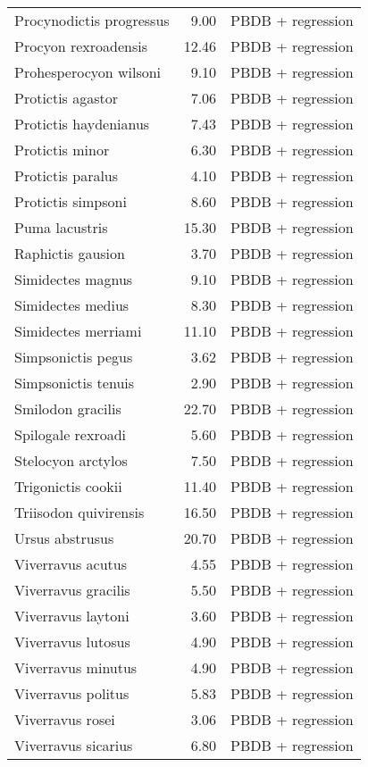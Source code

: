 \begin{table}[ht]
\begin{tabular}{lrl}
  Procynodictis progressus & 9.00 & PBDB + regression \\ 
  Procyon rexroadensis & 12.46 & PBDB + regression \\ 
  Prohesperocyon wilsoni & 9.10 & PBDB + regression \\ 
  Protictis agastor & 7.06 & PBDB + regression \\ 
  Protictis haydenianus & 7.43 & PBDB + regression \\ 
  Protictis minor & 6.30 & PBDB + regression \\ 
  Protictis paralus & 4.10 & PBDB + regression \\ 
  Protictis simpsoni & 8.60 & PBDB + regression \\ 
  Puma lacustris & 15.30 & PBDB + regression \\ 
  Raphictis gausion & 3.70 & PBDB + regression \\ 
  Simidectes magnus & 9.10 & PBDB + regression \\ 
  Simidectes medius & 8.30 & PBDB + regression \\ 
  Simidectes merriami & 11.10 & PBDB + regression \\ 
  Simpsonictis pegus & 3.62 & PBDB + regression \\ 
  Simpsonictis tenuis & 2.90 & PBDB + regression \\ 
  Smilodon gracilis & 22.70 & PBDB + regression \\ 
  Spilogale rexroadi & 5.60 & PBDB + regression \\ 
  Stelocyon arctylos & 7.50 & PBDB + regression \\ 
  Trigonictis cookii & 11.40 & PBDB + regression \\ 
  Triisodon quivirensis & 16.50 & PBDB + regression \\ 
  Ursus abstrusus & 20.70 & PBDB + regression \\ 
  Viverravus acutus & 4.55 & PBDB + regression \\ 
  Viverravus gracilis & 5.50 & PBDB + regression \\ 
  Viverravus laytoni & 3.60 & PBDB + regression \\ 
  Viverravus lutosus & 4.90 & PBDB + regression \\ 
  Viverravus minutus & 4.90 & PBDB + regression \\ 
  Viverravus politus & 5.83 & PBDB + regression \\ 
  Viverravus rosei & 3.06 & PBDB + regression \\ 
  Viverravus sicarius & 6.80 & PBDB + regression \\ 

\end{tabular}
\end{table}
